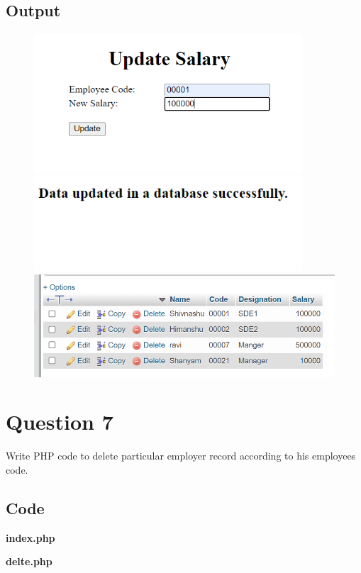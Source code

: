 \documentclass{article}
\begin{document}
\subsection*{Output}
\begin{figure}[H]
  \centering
  \includegraphics[width=10cm]{6/out.png}
  \includegraphics[width=10cm]{6/out2.png}
  \includegraphics[width=14cm]{6/out3.png}
\end{figure}


\newpage
\section*{Question 7}
Write PHP code to delete particular employer record according to his employees code.
\subsection*{Code}
\textbf{index.php}

\textbf{delte.php}

\newpage
\end{document}
